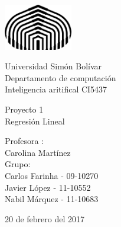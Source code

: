 

\begin{titlepage}

\setlength{\hoffset}{-0.3in}
\setlength{\voffset}{-1in}
\setlength{\topmargin}{1.5cm}
\setlength{\headheight}{0.5cm}
\setlength{\headsep}{1cm}
\setlength{\oddsidemargin}{3cm}
\setlength{\evensidemargin}{3cm}
\setlength{\footskip}{1.5cm}
\enlargethispage{1cm}

\fontsize{12pt}{14pt}
\selectfont

\begin{center}

\includegraphics[height=2cm]{logo.png}

\vspace{0.5cm}

Universidad Sim\'on Bol\'ivar\\
Departamento de computaci\'on\\
Inteligencia aritifical CI5437\\

\vspace{3.5cm}

\fontsize{17.28pt}{21pt}
\selectfont

Proyecto 1 \\
Regresi\'on Lineal\\

\fontsize{12pt}{14pt}
\selectfont

\vspace{.6cm}



\vspace{.4cm}


\vspace{3cm}

Profesora : \\
Carolina Mart\'inez\\
\vspace{1cm}
Grupo: \\
Carlos Farinha   - 09-10270 \\
Javier L\'opez     - 11-10552 \\
Nabil  M\'arquez  - 11-10683 \\


\vspace{1cm}

20 de febrero del 2017

\end{center}
\end{titlepage}


